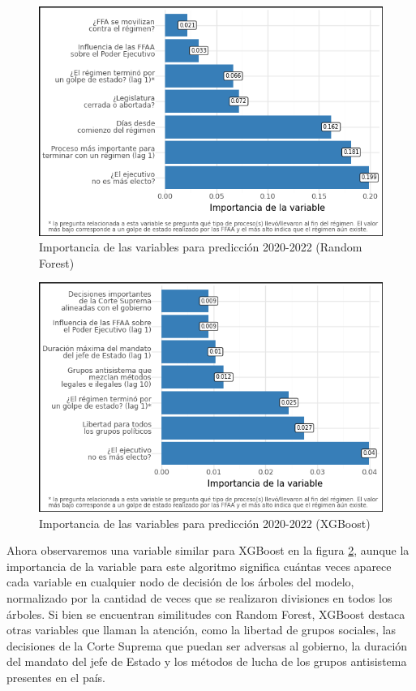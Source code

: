 \documentclass{article}
\begin{document}
\begin{figure}[H]
 \centering 
 \includegraphics[width=1\textwidth]{7_feature_importance_rf.png}
 \caption{Importancia de las variables para predicción 2020-2022 (Random Forest) \label{fig:feat_imp_rf}}
\end{figure}

\begin{figure}[H]
 \centering 
 \includegraphics[width=1\textwidth]{8_feature_importance_xgb.png}
 \caption{Importancia de las variables para predicción 2020-2022 (XGBoost) \label{fig:feat_imp_xgb}}
\end{figure}

Ahora observaremos una variable similar para XGBoost en la figura \ref{fig:feat_imp_xgb}, aunque la 
importancia de la variable para este algoritmo significa cuántas veces aparece cada variable
en cualquier nodo de decisión de los árboles del modelo, normalizado por la cantidad de veces
que se realizaron divisiones en todos los árboles. Si bien se encuentran similitudes con Random Forest,
XGBoost destaca otras variables que llaman la atención, como la libertad de grupos sociales, las 
decisiones de la Corte Suprema que puedan ser adversas al gobierno, la duración del mandato del jefe de 
Estado y los métodos de lucha de los grupos antisistema presentes en el país.
\end{document}
